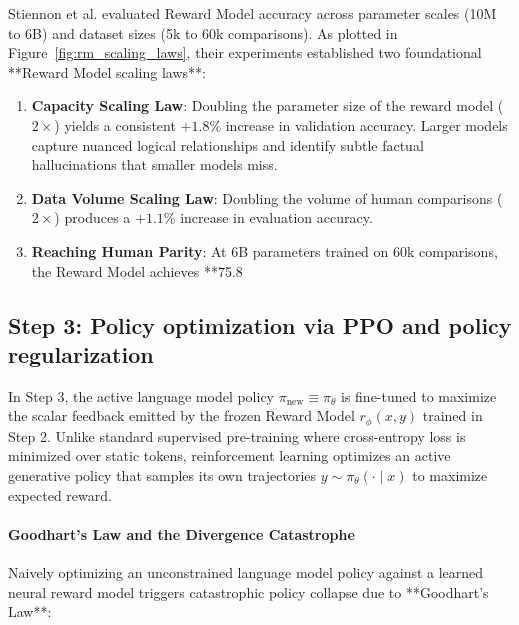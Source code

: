 \documentclass[../../../main.tex]{subfiles}
\begin{document}
Stiennon et al. evaluated Reward Model accuracy across parameter scales (10M to 6B) and dataset sizes (5k to 60k comparisons). As plotted in Figure~\ref{fig:rm_scaling_laws}, their experiments established two foundational **Reward Model scaling laws**:
\begin{enumerate}
    \item \textbf{Capacity Scaling Law}: Doubling the parameter size of the reward model ($2\times$) yields a consistent $\mathbf{+1.8\%}$ increase in validation accuracy. Larger models capture nuanced logical relationships and identify subtle factual hallucinations that smaller models miss.
    \item \textbf{Data Volume Scaling Law}: Doubling the volume of human comparisons ($2\times$) produces a $\mathbf{+1.1\%}$ increase in evaluation accuracy.
    \item \textbf{Reaching Human Parity}: At 6B parameters trained on 60k comparisons, the Reward Model achieves **75.8%
\end{enumerate}

\subsection{Step 3: Policy optimization via PPO and policy regularization}
\label{subsec:step3_ppo_policy_optimization}

In Step 3, the active language model policy $\pi_{\text{new}} \equiv \pi_\theta$ is fine-tuned to maximize the scalar feedback emitted by the frozen Reward Model $r_\phi(x, y)$ trained in Step 2. Unlike standard supervised pre-training where cross-entropy loss is minimized over static tokens, reinforcement learning optimizes an active generative policy that samples its own trajectories $y \sim \pi_\theta(\cdot \mid x)$ to maximize expected reward.

\paragraph{Goodhart's Law and the Divergence Catastrophe}
Naively optimizing an unconstrained language model policy against a learned neural reward model triggers catastrophic policy collapse due to **Goodhart's Law**:
\end{document}

